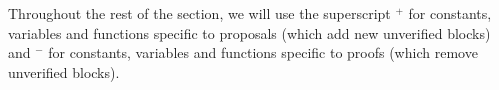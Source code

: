 \documentclass[9pt,oneside]{amsart}
\begin{document}
\begin{multicols}{2}
Throughout the rest of the section, we will use the superscript $^+$ for constants, variables and functions specific to proposals (which add new unverified blocks) and $^-$ for constants, variables and functions specific to proofs (which remove unverified blocks). 




\end{multicols}
\end{document}
